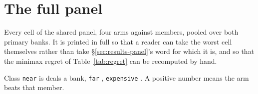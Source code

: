 \section{The full panel}
\label{app:panel}

Every cell of the shared panel, four arms against \vsevenPanelMembers{} members, pooled over both
primary banks. It is printed in full so that a reader can take the worst cell themselves rather than
take \S\ref{sec:results-panel}'s word for which it is, and so that the minimax regret of
Table~\ref{tab:regret} can be recomputed by hand.

Class \texttt{near} is \vsevenDealsNear{} deals a bank, \texttt{far} \vsevenDealsFar{},
\texttt{expensive} \vsevenDealsExpensive{}. A
positive number means the arm beats that member.

{\small}
